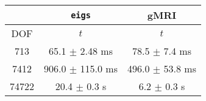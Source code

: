 \centering
\renewcommand{\arraystretch}{1.1}
\begin{tabular}{@{}c|c|c@{}}
    \toprule
     & \texttt{eigs} & gMRI \\
    \midrule
    DOF & $t$ &  $t$ \\
    \midrule
    713 & 65.1 $\pm$ 2.48 ms & 78.5 $\pm$ 7.4 ms \\
    7412 & 906.0 $\pm$ 115.0 ms & 496.0 $\pm$ 53.8 ms \\
    74722 & 20.4 $\pm$ 0.3 s & 6.2 $\pm$ 0.3 s \\
    \bottomrule
\end{tabular}